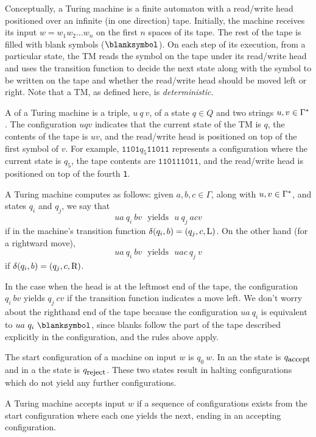 \documentclass[twoside,letterpaper,openany]{book}
\begin{document}
\begin{discussion}
Conceptually, a Turing machine is a finite automaton with a read/write head positioned over an infinite (in one direction) tape. Initially, the machine receives its input $w = w_1 w_2 \ldots w_n$ on the first $n$ spaces of its tape. The rest of the tape is filled with blank symbols ($\blanksymbol$). On each step of its execution, from a particular state, the TM reads the symbol on the tape under its read/write head and uses the transition function to decide the next state along with the symbol to be written on the tape and whether the read/write head should be moved left or right. Note that a TM, as defined here, is \emph{deterministic}. 
\end{discussion}

\begin{defn}
A  of a Turing machine is a triple, $u~q~v$, of a state $q \in Q$ and two strings $u, v \in \Gamma^{*}$. The configuration $uqv$ indicates that the current state of the TM is $q$, the contents of the tape is $uv$, and the read/write head is positioned on top of the first symbol of $v$. For example, $\texttt{1101}q_5\texttt{11011}$ represents a configuration where the current state is $q_5$, the tape contents are $\texttt{110111011}$, and the read/write head is positioned on top of the fourth \texttt{1}.
\end{defn}

\begin{defn}
A Turing machine computes as follows: given $a, b, c \in \Gamma$, along with $u, v \in \Gamma^{*}$, and states $q_i$ and $q_j$, we say that 
\[ ua~q_i~bv  ~~~\textrm{yields}~~~ u~q_j~acv \]
if in the machine's transition function $\delta(q_i, b) = (q_j, c, \textrm{L})$. On the other hand (for a rightward move), 
\[ ua~q_i~bv  ~~~\textrm{yields}~~~ uac~q_j~v \]
if $\delta(q_i, b) = (q_j, c, \textrm{R})$.

In the case when the head is at the leftmost end of the tape, the configuration $q_i~bv$  yields $q_j~cv$ if the transition function indicates a move left. We don't worry about the righthand end of the tape because the configuration $ua~q_i$ is equivalent to $ua~q_i~\blanksymbol$, since blanks follow the part of the tape described explicitly in the configuration, and the rules above apply.

The start configuration of a machine on input $w$ is $q_0~w$. In an  the state is $q_\textrm{\small accept}$ and in a  the state is $q_\textrm{\small reject}$. These two states result in halting configurations which do not yield any further configurations.

A Turing machine accepts input $w$ if a sequence of configurations exists from the start configuration where each one yields the next, ending in an accepting configuration.
\end{defn}
\end{document}
